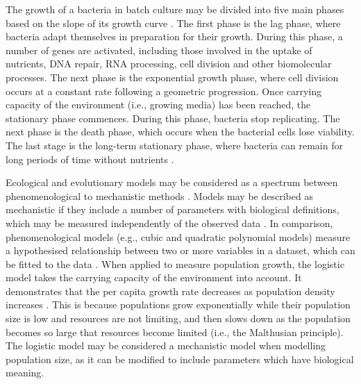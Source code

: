 \documentclass{article}[11pt]
\begin{document}
\begin{flushleft}
The growth of a bacteria in batch culture may be divided into five main phases based on the slope of its growth curve \cite{rolfe2012lag}\cite{huang2013optimization}\cite{finkel2006long}\cite{zwietering1990modeling}. The first phase is the lag phase, where bacteria adapt themselves in preparation for their growth. During this phase, a number of genes are activated, including those involved in the uptake of nutrients, DNA repair, RNA processing, cell division and other biomolecular processes. The next phase is the exponential growth phase, where cell division occurs at a constant rate following a geometric progression. Once carrying capacity of the environment (i.e., growing media) has been reached, the stationary phase commences. During this phase, bacteria stop replicating. The next phase is the death phase, which occurs when the bacterial cells lose viability. The last stage is the long-term stationary phase,  where bacteria can remain for long periods of time without nutrients \cite{finkel2006long}.
\linebreak


Ecological and evolutionary models may be considered as a spectrum between phenomenological to mechanistic methods \cite{white2019should}. Models may be described as mechanistic if they include a number of parameters with biological definitions, which may be measured independently of the observed data \cite{transtrum2016bridging}\cite{white2019should}. In comparison, phenomenological models (e.g., cubic and quadratic polynomial models) measure a hypothesised relationship between two or more variables in a dataset, which can be fitted to the data \cite{white2019should}. When applied to measure population growth, the logistic model takes the carrying capacity of the environment into account. It demonstrates that the per capita growth rate decreases as population density increases \cite{stefan2012mathematical}. This is because populations grow exponentially while their population size is low and resources are not limiting, and then slows down as the population becomes so large that resources become limited (i.e., the Malthusian principle). The logistic model may be considered a mechanistic model when modelling population size, as it can be modified to include parameters which have biological meaning.
\linebreak



\end{flushleft}
\end{document}
